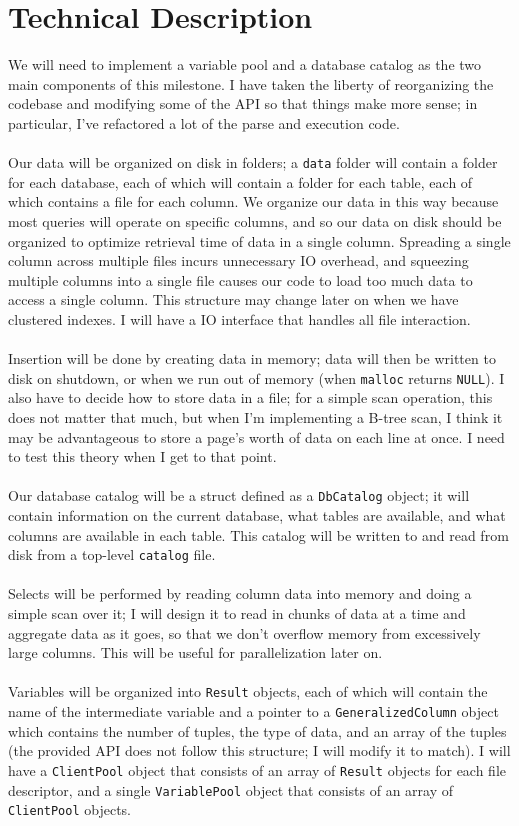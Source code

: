 \documentclass[12pt]{article}
\newcommand{\code}{\texttt}
\begin{document}
\section{Technical Description}
We will need to implement a variable pool and a database catalog as the two main components of this milestone.  I have taken the liberty of reorganizing the codebase and modifying some of the API so that things make more sense; in particular, I've refactored a lot of the parse and execution code.  
\\\\Our data will be organized on disk in folders; a \code{data} folder will contain a folder for each database, each of which will contain a folder for each table, each of which contains a file for each column.  We organize our data in this way because most queries will operate on specific columns, and so our data on disk should be organized to optimize retrieval time of data in a single column.  Spreading a single column across multiple files incurs unnecessary IO overhead, and squeezing multiple columns into a single file causes our code to load too much data to access a single column.  This structure may change later on when we have clustered indexes.  I will have a IO interface that handles all file interaction.
\\\\Insertion will be done by creating data in memory; data will then be written to disk on shutdown, or when we run out of memory (when \code{malloc} returns \code{NULL}).  I also have to decide how to store data in a file; for a simple scan operation, this does not matter that much, but when I'm implementing a B-tree scan, I think it may be advantageous to store a page's worth of data on each line at once.  I need to test this theory when I get to that point.
\\\\Our database catalog will be a struct defined as a \code{DbCatalog} object; it will contain information on the current database, what tables are available, and what columns are available in each table.  This catalog will be written to and read from disk from a top-level \code{catalog} file.
\\\\Selects will be performed by reading column data into memory and doing a simple scan over it; I will design it to read in chunks of data at a time and aggregate data as it goes, so that we don't overflow memory from excessively large columns.  This will be useful for parallelization later on.
\\\\Variables will be organized into \code{Result} objects, each of which will contain the name of the intermediate variable and a pointer to a \code{GeneralizedColumn} object which contains the number of tuples, the type of data, and an array of the tuples (the provided API does not follow this structure; I will modify it to match).  I will have a \code{ClientPool} object that consists of an array of \code{Result} objects for each file descriptor, and a single \code{VariablePool} object that consists of an array of \code{ClientPool} objects.
\end{document}
